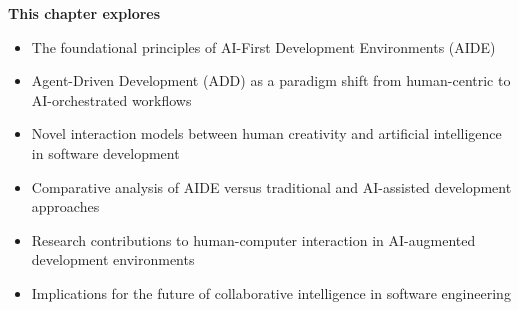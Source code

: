 \begin{tcolorbox}[
    enhanced,
    colback=white,
    colframe=brandPrimary!40,
    boxrule=1pt,
    arc=12pt,
    drop shadow={brandPrimary!20},
    left=1.5cm,
    right=1.5cm,
    top=1.2cm,
    bottom=1.2cm,
    before upper={\parindent0pt}
]
\begin{center}
{\Large\textbf{\textcolor{brandPrimary}{This chapter explores}}}
\end{center}


\begin{itemize}[leftmargin=1.2cm, itemsep=0.4cm, label={\textcolor{brandAccent}{$\triangleright$}}]
    \item {\large The foundational principles of AI-First Development Environments (AIDE)}
    \item {\large Agent-Driven Development (ADD) as a paradigm shift from human-centric to AI-orchestrated workflows}
    \item {\large Novel interaction models between human creativity and artificial intelligence in software development}
    \item {\large Comparative analysis of AIDE versus traditional and AI-assisted development approaches}
    \item {\large Research contributions to human-computer interaction in AI-augmented development environments}
    \item {\large Implications for the future of collaborative intelligence in software engineering}
\end{itemize}
\end{tcolorbox}

\clearpage
